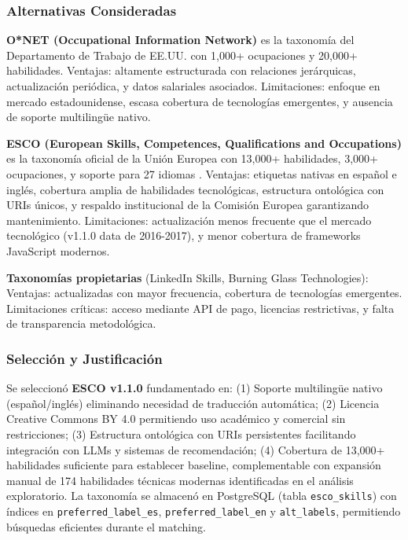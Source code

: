 \subsubsection{Alternativas Consideradas}

\textbf{O*NET (Occupational Information Network)} es la taxonomía del Departamento de Trabajo de EE.UU. con 1,000+ ocupaciones y 20,000+ habilidades. Ventajas: altamente estructurada con relaciones jerárquicas, actualización periódica, y datos salariales asociados. Limitaciones: enfoque en mercado estadounidense, escasa cobertura de tecnologías emergentes, y ausencia de soporte multilingüe nativo.

\textbf{ESCO (European Skills, Competences, Qualifications and Occupations)} es la taxonomía oficial de la Unión Europea con 13,000+ habilidades, 3,000+ ocupaciones, y soporte para 27 idiomas \cite{decorte2021}. Ventajas: etiquetas nativas en español e inglés, cobertura amplia de habilidades tecnológicas, estructura ontológica con URIs únicos, y respaldo institucional de la Comisión Europea garantizando mantenimiento. Limitaciones: actualización menos frecuente que el mercado tecnológico (v1.1.0 data de 2016-2017), y menor cobertura de frameworks JavaScript modernos.

\textbf{Taxonomías propietarias} (LinkedIn Skills, Burning Glass Technologies): Ventajas: actualizadas con mayor frecuencia, cobertura de tecnologías emergentes. Limitaciones críticas: acceso mediante API de pago, licencias restrictivas, y falta de transparencia metodológica.

\subsubsection{Selección y Justificación}

Se seleccionó \textbf{ESCO v1.1.0} fundamentado en: (1) Soporte multilingüe nativo (español/inglés) eliminando necesidad de traducción automática; (2) Licencia Creative Commons BY 4.0 permitiendo uso académico y comercial sin restricciones; (3) Estructura ontológica con URIs persistentes facilitando integración con LLMs y sistemas de recomendación; (4) Cobertura de 13,000+ habilidades suficiente para establecer baseline, complementable con expansión manual de 174 habilidades técnicas modernas identificadas en el análisis exploratorio. La taxonomía se almacenó en PostgreSQL (tabla \texttt{esco\_skills}) con índices en \texttt{preferred\_label\_es}, \texttt{preferred\_label\_en} y \texttt{alt\_labels}, permitiendo búsquedas eficientes durante el matching.

